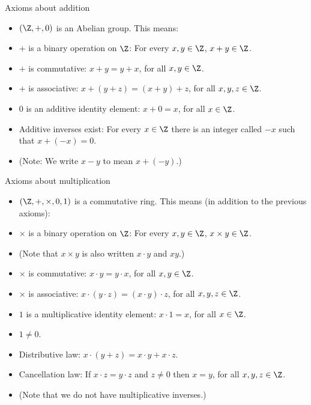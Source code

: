 \documentclass{beamer}
\begin{document}
\begin{frame}{Axioms about addition}

\begin{itemize}
  \item $\left(\Z, +, 0\right)$ is an Abelian group. This means:
  \item  $+$ is a binary operation on $\Z$: For every $x,y\in\Z$, $x+y\in\Z$.
  \item  $+$ is commutative: $x+y=y+x$, for all $x,y\in\Z$.
  \item  $+$ is associative: $x + (y+z) = (x+y) +z$, for all $x,y,z\in\Z$.
  \item  $0$ is an additive identity element: $x+0 = x$, for all $x\in\Z$.
  \item  Additive inverses exist: For every $x\in\Z$ there is an integer called $-x$ such that $x+(-x) = 0$.
  \item  (Note: We write $x-y$ to mean $x+(-y)$.)
\end{itemize}

\end{frame}

\begin{frame}{Axioms about multiplication}

\begin{itemize}
  \item $\left(\Z, +, \times, 0, 1\right)$ is a commutative ring. This means (in addition to the previous axioms):
  \item  $\times$ is a binary operation on $\Z$: For every $x,y\in\Z$, $x\times y\in\Z$.
  \item (Note that $x\times y$ is also written $x\cdot y$ and $x y$.)
  \item  $\times$ is commutative: $x\cdot y= y \cdot x$, for all $x,y\in\Z$.
  \item  $\times $ is associative: $x \cdot (y\cdot z) = (x\cdot y) \cdot z$, for all $x,y,z\in\Z$.
  \item  $1$ is a multiplicative identity element: $x\cdot 1 = x$, for all $x\in\Z$.
  \item $1\not=0$.
  \item Distributive law: $x\cdot (y + z) = x \cdot y + x \cdot z$.
  \item Cancellation law: If $x\cdot z = y \cdot z$ and $z\not=0$ then $x=y$, for all $x,y,z\in\Z$.
  \item  (Note that we do not have multiplicative inverses.)
\end{itemize}

\end{frame}
\end{document}
